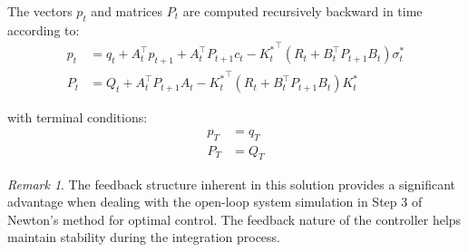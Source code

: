 \documentclass[openany]{book}
\theoremstyle{definition}
\theoremstyle{remark}
\newtheorem*{remark}{Remark}
\begin{document}
The vectors $p_t$ and matrices $P_t$ are computed recursively backward in time according to:
\begin{align*}
    p_t &= q_t + A_t^\top p_{t+1} + A_t^\top P_{t+1}c_t - {K_t^*}^\top(R_t + B_t^\top P_{t+1}B_t)\sigma_t^* \\
    P_t &= Q_t + A_t^\top P_{t+1}A_t - {K_t^*}^\top(R_t + B_t^\top P_{t+1}B_t)K_t^*
\end{align*}

with terminal conditions:
\begin{align*}
    p_T &= q_T \\
    P_T &= Q_T
\end{align*}

\begin{remark}
The feedback structure inherent in this solution provides a significant advantage when dealing with the open-loop system simulation in Step 3 of Newton's method for optimal control. The feedback nature of the controller helps maintain stability during the integration process.
\end{remark}
\end{document}
